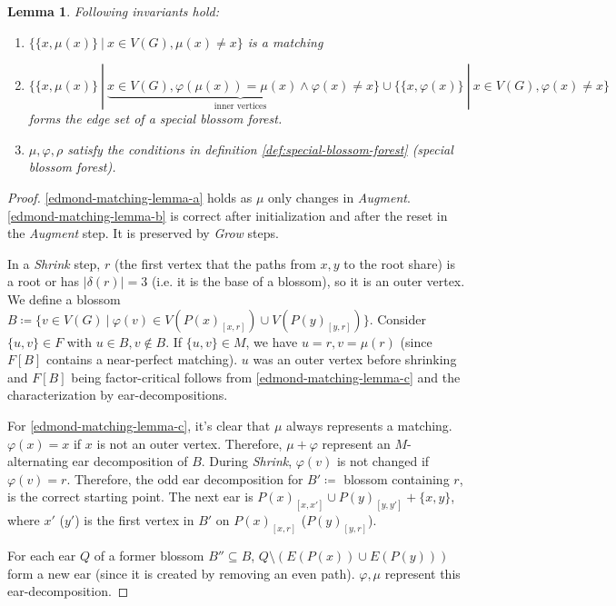 \documentclass[11pt, a4paper]{article}
\newcommand{\abs}[1]{\left\lvert#1\right\rvert}
\newcommand{\set}[1]{\{#1\}}
\newtheorem{lemma}[theorem]{Lemma}
\theoremstyle{remark}
\theoremstyle{definition}
\begin{document}
\begin{lemma}
Following invariants hold:
\begin{enumerate}[label=\alph*)]\label{edmond-matching-lemma}
	\item $\set{\set{x,\mu(x)}\ |\ x\in V(G),\mu(x)\neq x}$ is a matching
	\label{edmond-matching-lemma-a}

	\item $\set{\set{x,\mu(x)}\ |\ \underbrace{x\in
	V(G),\varphi(\mu(x))=\mu(x) \land \varphi(x)\neq x}
		_{\text{inner vertices}}
	}\cup\set{\set{x,\varphi(x)}\ |\ x\in V(G), \varphi(x)\neq x}$
	forms the edge set of a special blossom forest.
	\label{edmond-matching-lemma-b}
	
	\item $\mu,\varphi,\rho$ satisfy the conditions in definition
	\ref{def:special-blossom-forest} (special blossom forest).
	\label{edmond-matching-lemma-c}
\end{enumerate}
\end{lemma}

\begin{proof}
\ref{edmond-matching-lemma-a} holds as $\mu$ only changes in \emph{Augment}.
\ref{edmond-matching-lemma-b} is correct after initialization and after
the reset in the \emph{Augment} step. It is preserved by \emph{Grow} steps.

In a \emph{Shrink} step, $r$ (the first vertex that the paths from $x,y$ to the
root share) is a root or has $\abs{\delta(r)}=3$ (i.e. it is the base of
a blossom), so it is an outer vertex. We define a blossom
$B\coloneqq \set{v\in V(G)\ |\ \varphi(v)\in V(P(x)_{[x,r]})\cup
V(P(y)_{[y,r]})}$. Consider $\set{u,v}\in F$ with $u\in B, v\notin B$. If
$\set{u,v}\in M$, we have $u=r, v=\mu(r)$ (since $F[B]$ contains a near-perfect
matching). $u$ was an outer vertex before shrinking and $F[B]$ being
factor-critical follows from \ref{edmond-matching-lemma-c} and the
characterization by ear-decompositions.

For \ref{edmond-matching-lemma-c}, it's clear that $\mu$ always represents
a matching. $\varphi(x)=x$ if $x$ is not an outer vertex. Therefore,
$\mu+\varphi$ represent an $M$-alternating ear decomposition of $B$. During
\emph{Shrink}, $\varphi(v)$ is not changed if $\varphi(v)=r$. Therefore,
the odd ear decomposition for $B'\coloneqq$ blossom containing $r$, is
the correct starting point. The next ear is $P(x)_{[x,x']}\cup P(y)_{[y,y']}
+\set{x,y}$, where $x'$ ($y'$) is the first vertex in $B'$ on $P(x)_{[x,r]}$
($P(y)_{[y,r]}$).

For each ear $Q$ of a former blossom $B''\subseteq B$, $Q\setminus
\left(E(P(x))\cup E(P(y))\right)$ form a new ear (since it is created
by removing an even path). $\varphi,\mu$ represent this ear-decomposition.
\end{proof}
\end{document}
